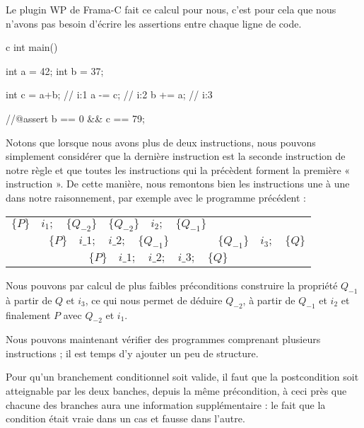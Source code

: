 Le plugin WP de Frama-C fait ce calcul pour nous, c'est pour cela que nous 
n'avons pas besoin d'écrire les assertions entre chaque ligne de code.



\begin{CodeBlock}{c}
int main(){
  int a = 42;
  int b = 37;

  int c = a+b; // i:1
  a -= c;      // i:2
  b += a;      // i:3

  //@assert b == 0 && c == 79;
}
\end{CodeBlock}





Notons que lorsque nous avons plus de deux instructions, nous pouvons simplement
considérer que la dernière instruction est la seconde instruction de notre règle
et que toutes les instructions qui la précèdent forment la première « instruction ». 
De cette manière, nous remontons bien les instructions une à une dans notre
raisonnement, par exemple avec le programme précédent :


\begin{center}
\begin{tabular}{ccc}
  $\{P\}\quad i_1 ; \quad \{Q_{-2}\}$ & $\{Q_{-2}\}\quad i_2 ; \quad \{Q_{-1}\}$ & \\
  \cline{1-2}
  \multicolumn{2}{c}{$\{P\}\quad i\_1 ; \quad i\_2 ; \quad \{Q_{-1}\}$} & $\{Q_{-1}\} \quad i_3 ; \quad \{Q\}$\\
  \hline
  \multicolumn{3}{c}{$\{P\}\quad i\_1 ; \quad i\_2 ; \quad i\_3; \quad \{ Q \}$}
\end{tabular}
\end{center}

Nous pouvons par calcul de plus faibles préconditions construire la propriété
$Q_{-1}$ à partir de $Q$ et $i_3$, ce qui nous permet de déduire $Q_{-2}$, à 
partir de $Q_{-1}$ et $i_2$ et finalement $P$ avec $Q_{-2}$ et $i_1$.



Nous pouvons maintenant vérifier des programmes comprenant plusieurs 
instructions ; il est temps d'y ajouter un peu de structure.





Pour qu'un branchement conditionnel soit valide, il faut que la postcondition
soit atteignable par les deux banches, depuis la même précondition, à ceci 
près que chacune des branches aura une information supplémentaire : le fait 
que la condition était vraie dans un cas et fausse dans l'autre.



